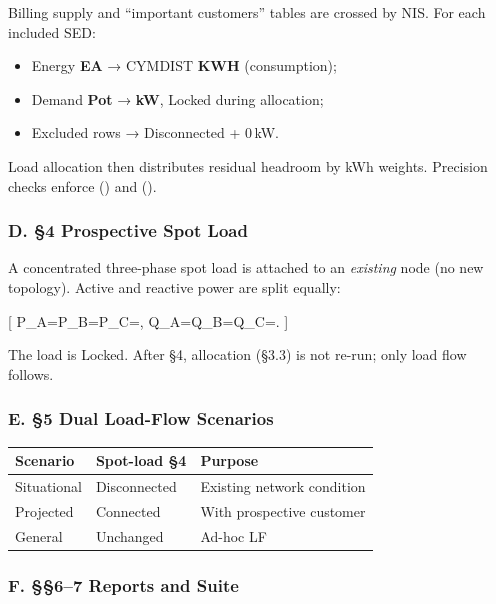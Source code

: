 \documentclass[
  11pt,
]{article}
\newcounter{none} %
\providecommand{\tightlist}{%
  \setlength{\itemsep}{0pt}\setlength{\parskip}{0pt}}
\begin{document}
Billing supply and “important customers” tables are crossed by NIS. For
each included SED:

\begin{itemize}
\tightlist
\item
  Energy \textbf{EA} → CYMDIST \textbf{KWH} (consumption);
\item
  Demand \textbf{Pot} → \textbf{kW}, Locked during allocation;
\item
  Excluded rows → Disconnected + 0\,kW.
\end{itemize}

Load allocation then distributes residual headroom by kWh weights.
Precision checks enforce (\textbar{}\Delta{}\textbar{})
and (\textbar{}\Delta{}\textbar{}).

\subsubsection{D. §4 Prospective Spot
Load}\label{d.-4-prospective-spot-load}

A concentrated three-phase spot load is attached to an \emph{existing}
node (no new topology). Active and reactive power are split equally:

{[} P\_A=P\_B=P\_C=,\qquad
Q\_A=Q\_B=Q\_C=. {]}

The load is Locked. After §4, allocation (§3.3) is not re-run; only load
flow follows.

\subsubsection{E. §5 Dual Load-Flow
Scenarios}\label{e.-5-dual-load-flow-scenarios}

{\def\LTcaptype{none} %
\begin{longtable}[]{@{}lll@{}}
\toprule\noalign{}
Scenario & Spot-load §4 & Purpose \\
\midrule\noalign{}
\endhead
\bottomrule\noalign{}
\endlastfoot
Situational & Disconnected & Existing network condition \\
Projected & Connected & With prospective customer \\
General & Unchanged & Ad-hoc LF \\
\end{longtable}
}

\subsubsection{F. §§6–7 Reports and
Suite}\label{f.-67-reports-and-suite}
\end{document}
